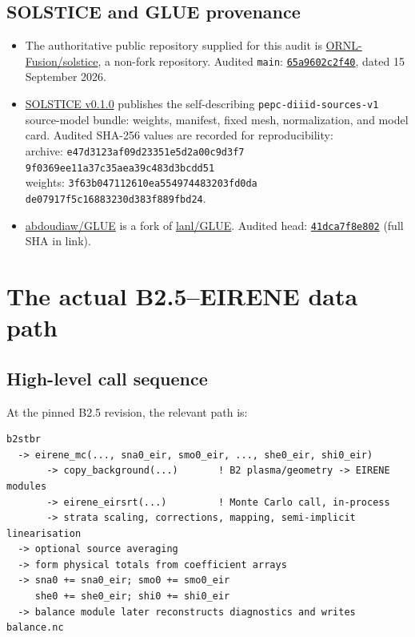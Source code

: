 \documentclass[11pt]{article}
\begin{document}
\subsection{SOLSTICE and GLUE provenance}

\begin{itemize}
\item The authoritative public repository supplied for this audit is \href{https://github.com/ORNL-Fusion/solstice}{ORNL-Fusion/solstice}, a non-fork repository. Audited \texttt{main}: \href{https://github.com/ORNL-Fusion/solstice/commit/65a9602c2f40bfbec50e594d58b2e659614c51d5}{\texttt{65a9602c2f40}}, dated 15 September 2026.
\item \href{https://github.com/ORNL-Fusion/solstice/releases/tag/v0.1.0}{SOLSTICE v0.1.0} publishes the self-describing \texttt{pepc-diiid-sources-v1} source-model bundle: weights, manifest, fixed mesh, normalization, and model card. Audited SHA-256 values are recorded for reproducibility:\\
archive: \texttt{e47d3123af09d23351e5d2a00c9d3f7}\\
\phantom{archive: }\texttt{9f0369ee11a37c35aea39c483d3bcdd51}\\
weights: \texttt{3f63b047112610ea554974483203fd0da}\\
\phantom{weights: }\texttt{de07917f5c16883230d383f889fbd24}.
\item \href{https://github.com/abdoudiaw/GLUE}{abdoudiaw/GLUE} is a fork of \href{https://github.com/lanl/GLUE}{lanl/GLUE}. Audited head: \href{https://github.com/abdoudiaw/GLUE/commit/41dca7f8e802d5adc1103aaf6e39eaf08c172dce}{\texttt{41dca7f8e802}} (full SHA in link).
\end{itemize}

\section{The actual B2.5--EIRENE data path}

\subsection{High-level call sequence}

At the pinned B2.5 revision, the relevant path is:

\begin{lstlisting}[basicstyle=\ttfamily\small,frame=single]
b2stbr
  -> eirene_mc(..., sna0_eir, smo0_eir, ..., she0_eir, shi0_eir)
       -> copy_background(...)       ! B2 plasma/geometry -> EIRENE modules
       -> eirene_eirsrt(...)         ! Monte Carlo call, in-process
       -> strata scaling, corrections, mapping, semi-implicit linearisation
  -> optional source averaging
  -> form physical totals from coefficient arrays
  -> sna0 += sna0_eir; smo0 += smo0_eir
     she0 += she0_eir; shi0 += shi0_eir
  -> balance module later reconstructs diagnostics and writes balance.nc
\end{lstlisting}
\end{document}
